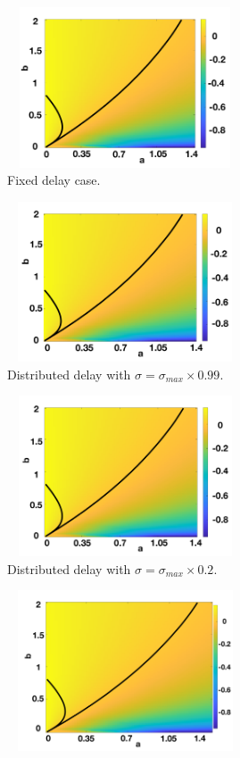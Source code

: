 \documentclass[12pt]{report}
\begin{document}
\begin{figure}[H]
    \centering
    \begin{subfigure}[b]{0.45\textwidth}
        \centering
        \includegraphics[width=7cm,height=4.75cm]{t2f1.png}
        \caption{Fixed delay case.}
        \label{}
    \end{subfigure}
    \hfill
    \begin{subfigure}[b]{0.45\textwidth}
        \centering
        \includegraphics[width=7cm,height=4.75cm]{t2f2.png}
        \caption{Distributed delay with $\sigma=\sigma_{max}\times0.99$.}
        \label{}
    \end{subfigure}
    \hfill
    \begin{subfigure}[b]{0.45\textwidth}
        \centering
        \includegraphics[width=7cm,height=4.75cm]{t2f3.png}
        \caption{Distributed delay with $\sigma=\sigma_{max}\times0.2$.}
        \label{}
    \end{subfigure}
    \hfill
    \begin{subfigure}[b]{0.45\textwidth}
        \centering
        \includegraphics[width=7cm,height=4.75cm]{t2f4.png}

\end{subfigure}
\end{figure}
\end{document}
